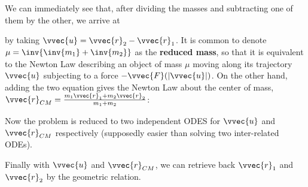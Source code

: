 \documentclass[class=article, crop=false, 12pt]{standalone}
\begin{document}
We can immediately see that, after dividing the masses and subtracting one of them by the other, we arrive at

by taking $\vvec{u} = \vvec{r}_2 - \vvec{r}_1$. It is common to denote $\mu = \inv{\inv{m_1}+\inv{m_2}}$ as the \textbf{reduced mass}, 
so that it is equivalent to the Newton  Law describing an object of mass $\mu$ moving along its trajectory $\vvec{u}$ subjecting to a force $-\vvec{F}(\abs{\vvec{u}})$. 
On the other hand, adding the two equation gives the Newton  Law about the center of mass, $\vvec{r}_{CM} = \frac{m_1\vvec{r}_1+m_2\vvec{r}_2}{m_1+m_2}$:


Now the problem is reduced to two independent ODES for $\vvec{u}$ and $\vvec{r}_{CM}$ respectively (supposedly easier than solving two inter-related ODEs).

Finally with $\vvec{u}$ and $\vvec{r}_{CM}$, we can retrieve back $\vvec{r}_1$ and $\vvec{r}_2$ by the geometric relation.
\end{document}
